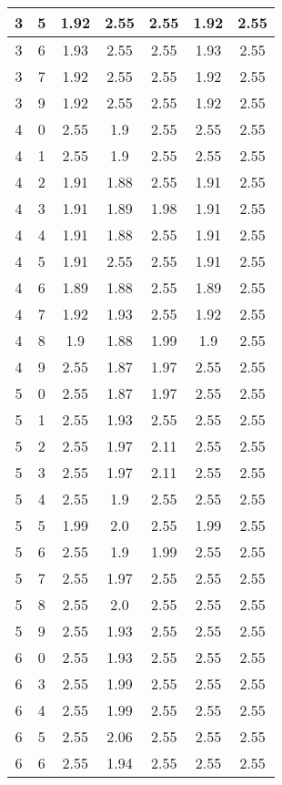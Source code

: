 \begin{longtable}{|c|c||c||c|c||c|c|}
	3 & 5 & 1.92 & 2.55 & 2.55 & 1.92 & 2.55 \\ \hline
	3 & 6 & 1.93 & 2.55 & 2.55 & 1.93 & 2.55 \\ \hline
	3 & 7 & 1.92 & 2.55 & 2.55 & 1.92 & 2.55 \\ \hline
	3 & 9 & 1.92 & 2.55 & 2.55 & 1.92 & 2.55 \\ \hline
	4 & 0 & 2.55 & 1.9 & 2.55 & 2.55 & 2.55 \\ \hline
	4 & 1 & 2.55 & 1.9 & 2.55 & 2.55 & 2.55 \\ \hline
	4 & 2 & 1.91 & 1.88 & 2.55 & 1.91 & 2.55 \\ \hline
	4 & 3 & 1.91 & 1.89 & 1.98 & 1.91 & 2.55 \\ \hline
	4 & 4 & 1.91 & 1.88 & 2.55 & 1.91 & 2.55 \\ \hline
	4 & 5 & 1.91 & 2.55 & 2.55 & 1.91 & 2.55 \\ \hline
	4 & 6 & 1.89 & 1.88 & 2.55 & 1.89 & 2.55 \\ \hline
	4 & 7 & 1.92 & 1.93 & 2.55 & 1.92 & 2.55 \\ \hline
	4 & 8 & 1.9 & 1.88 & 1.99 & 1.9 & 2.55 \\ \hline
	4 & 9 & 2.55 & 1.87 & 1.97 & 2.55 & 2.55 \\ \hline
	5 & 0 & 2.55 & 1.87 & 1.97 & 2.55 & 2.55 \\ \hline
	5 & 1 & 2.55 & 1.93 & 2.55 & 2.55 & 2.55 \\ \hline
	5 & 2 & 2.55 & 1.97 & 2.11 & 2.55 & 2.55 \\ \hline
	5 & 3 & 2.55 & 1.97 & 2.11 & 2.55 & 2.55 \\ \hline
	5 & 4 & 2.55 & 1.9 & 2.55 & 2.55 & 2.55 \\ \hline
	5 & 5 & 1.99 & 2.0 & 2.55 & 1.99 & 2.55 \\ \hline
	5 & 6 & 2.55 & 1.9 & 1.99 & 2.55 & 2.55 \\ \hline
	5 & 7 & 2.55 & 1.97 & 2.55 & 2.55 & 2.55 \\ \hline
	5 & 8 & 2.55 & 2.0 & 2.55 & 2.55 & 2.55 \\ \hline
	5 & 9 & 2.55 & 1.93 & 2.55 & 2.55 & 2.55 \\ \hline
	6 & 0 & 2.55 & 1.93 & 2.55 & 2.55 & 2.55 \\ \hline
	6 & 3 & 2.55 & 1.99 & 2.55 & 2.55 & 2.55 \\ \hline
	6 & 4 & 2.55 & 1.99 & 2.55 & 2.55 & 2.55 \\ \hline
	6 & 5 & 2.55 & 2.06 & 2.55 & 2.55 & 2.55 \\ \hline
	6 & 6 & 2.55 & 1.94 & 2.55 & 2.55 & 2.55 \\ \hline

\end{longtable}
